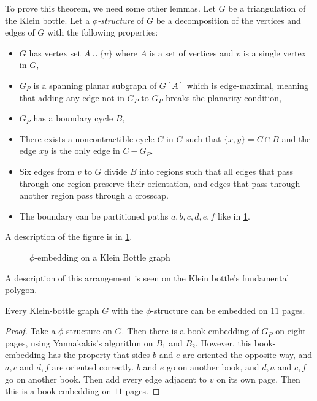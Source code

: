 To prove this theorem, we need some other lemmas. Let $G$ be a triangulation of the Klein bottle. Let a \textit{$\phi$-structure} of $G$ be a decomposition of the vertices and edges of $G$ with the following properties:
\begin{itemize}
    \item $G$ has vertex set $A \cup \{v\}$ where $A$ is a set of vertices and $v$ is a single vertex in $G$,
    \item $G_P$ is a spanning planar subgraph of $G[A]$ which is edge-maximal, meaning that adding any edge not in $G_P$ to $G_P$ breaks the planarity condition,
    \item $G_P$ has a boundary cycle $B$,
    \item There exists a noncontractible cycle $C$ in $G$ such that $\{x, y\} = C \cap B$ and the edge $xy$ is the only edge in $C - G_P$. 
    \item Six edges from $v$ to $G$ divide $B$ into regions such that all edges that pass through one region preserve their orientation, and edges that pass through another region pass through a crosscap. 
    \item The boundary can be partitioned paths $a, b, c, d, e, f$ like in \cref{fig:phiembedding}. 
\end{itemize}

A description of the figure is in \cref{fig:phiembedding}.

\begin{figure}[h]
    \centering
    
    \caption{$\phi$-embedding on a Klein Bottle graph}\label{fig:phiembedding}
\end{figure}

A description of this arrangement is seen on the Klein bottle's fundamental polygon. 
\begin{claim}
    Every Klein-bottle graph $G$ with the $\phi$-structure can be embedded on $11$ pages. 
\end{claim}
\begin{proof}
    Take a $\phi$-structure on $G$. Then there is a book-embedding of $G_P$ on eight pages, using Yannakakis's algorithm on $B_1$ and $B_2$. However, this book-embedding has the property that sides $b$ and $e$ are oriented the opposite way, and $a, c$ and $d, f$ are oriented correctly. $b$ and $e$ go on another book, and $d, a$ and $c, f$ go on another book. Then add every edge adjacent to $v$ on its own page. Then this is a book-embedding on $11$ pages. 
\end{proof}

